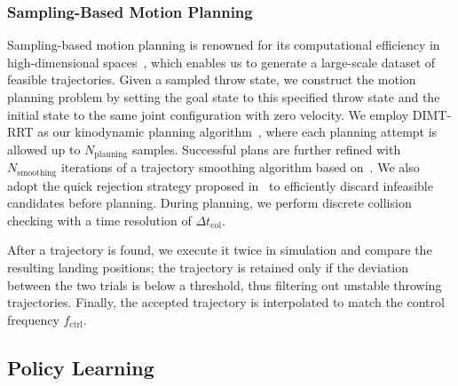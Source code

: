 \documentclass[letterpaper, 10 pt, conference]{ieeeconf}  %
\begin{document}
\subsubsection{Sampling-Based Motion Planning}
Sampling-based motion planning is renowned for its computational efficiency in high-dimensional spaces~\cite{lavalle2006planning}, which enables us to generate a large-scale dataset of feasible trajectories.
Given a sampled throw state, we construct the motion planning problem by setting the goal state to this specified throw state and the initial state to the same joint configuration with zero velocity. 
We employ DIMT-RRT as our kinodynamic planning algorithm~\cite{kunz2014dimtrrt}, 
where each planning attempt is allowed up to $N_{\mathrm{planning}}$ samples. 
Successful plans are further refined with $N_{\mathrm{smoothing}}$ iterations of a trajectory smoothing algorithm based on~\cite{hauser2010smoothing}. 
We also adopt the quick rejection strategy proposed in~\cite{zhang2012icra} to efficiently discard infeasible candidates before planning. 
During planning, we perform discrete collision checking with a time resolution of $\Delta t_{\mathrm{col}}$. 

After a trajectory is found, we execute it twice in simulation and compare the resulting landing positions; 
the trajectory is retained only if the deviation between the two trials is below a threshold, 
thus filtering out unstable throwing trajectories. Finally, the accepted trajectory is interpolated to match the control frequency $f_{\mathrm{ctrl}}$.

\subsection{Policy Learning}
\end{document}
